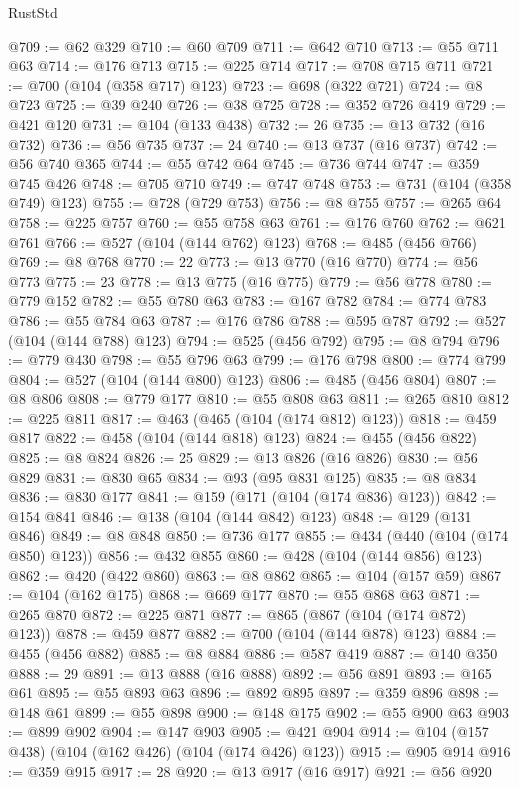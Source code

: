 \begin{lexlean}{RustStd}
\begin{coremodule}
@709 := @62 @329
@710 := @60 @709
@711 := @642 @710
@713 := @55 @711 @63
@714 := @176 @713
@715 := @225 @714
@717 := @708 @715 @711
@721 := @700 (@104 (@358 @717) @123)
@723 := @698 (@322 @721)
@724 := @8 @723
@725 := @39 @240
@726 := @38 @725
@728 := @352 @726 @419
@729 := @421 @120
@731 := @104 (@133 @438)
@732 := 26
@735 := @13 @732 (@16 @732)
@736 := @56 @735
@737 := 24
@740 := @13 @737 (@16 @737)
@742 := @56 @740 @365
@744 := @55 @742 @64
@745 := @736 @744
@747 := @359 @745 @426
@748 := @705 @710
@749 := @747 @748
@753 := @731 (@104 (@358 @749) @123)
@755 := @728 (@729 @753)
@756 := @8 @755
@757 := @265 @64
@758 := @225 @757
@760 := @55 @758 @63
@761 := @176 @760
@762 := @621 @761
@766 := @527 (@104 (@144 @762) @123)
@768 := @485 (@456 @766)
@769 := @8 @768
@770 := 22
@773 := @13 @770 (@16 @770)
@774 := @56 @773
@775 := 23
@778 := @13 @775 (@16 @775)
@779 := @56 @778
@780 := @779 @152
@782 := @55 @780 @63
@783 := @167 @782
@784 := @774 @783
@786 := @55 @784 @63
@787 := @176 @786
@788 := @595 @787
@792 := @527 (@104 (@144 @788) @123)
@794 := @525 (@456 @792)
@795 := @8 @794
@796 := @779 @430
@798 := @55 @796 @63
@799 := @176 @798
@800 := @774 @799
@804 := @527 (@104 (@144 @800) @123)
@806 := @485 (@456 @804)
@807 := @8 @806
@808 := @779 @177
@810 := @55 @808 @63
@811 := @265 @810
@812 := @225 @811
@817 := @463 (@465 (@104 (@174 @812) @123))
@818 := @459 @817
@822 := @458 (@104 (@144 @818) @123)
@824 := @455 (@456 @822)
@825 := @8 @824
@826 := 25
@829 := @13 @826 (@16 @826)
@830 := @56 @829
@831 := @830 @65
@834 := @93 (@95 @831 @125)
@835 := @8 @834
@836 := @830 @177
@841 := @159 (@171 (@104 (@174 @836) @123))
@842 := @154 @841
@846 := @138 (@104 (@144 @842) @123)
@848 := @129 (@131 @846)
@849 := @8 @848
@850 := @736 @177
@855 := @434 (@440 (@104 (@174 @850) @123))
@856 := @432 @855
@860 := @428 (@104 (@144 @856) @123)
@862 := @420 (@422 @860)
@863 := @8 @862
@865 := @104 (@157 @59)
@867 := @104 (@162 @175)
@868 := @669 @177
@870 := @55 @868 @63
@871 := @265 @870
@872 := @225 @871
@877 := @865 (@867 (@104 (@174 @872) @123))
@878 := @459 @877
@882 := @700 (@104 (@144 @878) @123)
@884 := @455 (@456 @882)
@885 := @8 @884
@886 := @587 @419
@887 := @140 @350
@888 := 29
@891 := @13 @888 (@16 @888)
@892 := @56 @891
@893 := @165 @61
@895 := @55 @893 @63
@896 := @892 @895
@897 := @359 @896
@898 := @148 @61
@899 := @55 @898
@900 := @148 @175
@902 := @55 @900 @63
@903 := @899 @902
@904 := @147 @903
@905 := @421 @904
@914 := @104 (@157 @438) (@104 (@162 @426) (@104 (@174 @426) @123))
@915 := @905 @914
@916 := @359 @915
@917 := 28
@920 := @13 @917 (@16 @917)
@921 := @56 @920

\end{coremodule}
\end{lexlean}
